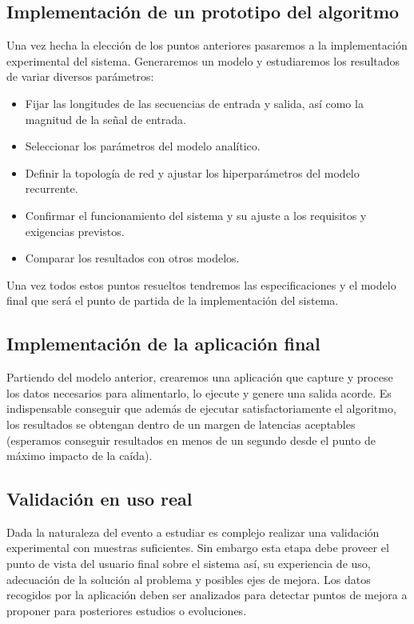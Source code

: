 \subsection{Implementación de un prototipo del algoritmo}
Una vez hecha la elección de los puntos anteriores pasaremos a la implementación experimental del sistema. Generaremos un modelo y estudiaremos los resultados de variar diversos parámetros:
\begin{itemize}
  \item Fijar las longitudes de las secuencias de entrada y salida, así como la magnitud de la señal de entrada.
  \item Seleccionar los parámetros del modelo analítico.
  \item Definir la topología de red y ajustar los hiperparámetros del modelo recurrente.
  \item Confirmar el funcionamiento del sistema y su ajuste a los requisitos y exigencias previstos.
  \item Comparar los resultados con otros modelos.
\end{itemize}
Una vez todos estos puntos resueltos tendremos las especificaciones y el modelo final que será el punto de partida de la implementación del sistema.

\subsection{Implementación de la aplicación final}
Partiendo del modelo anterior, crearemos una aplicación que capture y procese los datos necesarios para alimentarlo, lo ejecute y genere una salida acorde. Es indispensable conseguir que además de ejecutar satisfactoriamente el algoritmo, los resultados se obtengan dentro de un margen de latencias aceptables (esperamos conseguir resultados en menos de un segundo desde el punto de máximo impacto de la caída).

\subsection{Validación en uso real}
Dada la naturaleza del evento a estudiar es complejo realizar una validación experimental con muestras suficientes. Sin embargo esta etapa debe proveer el punto de vista del usuario final sobre el sistema así, su experiencia de uso, adecuación de la solución al problema y posibles ejes de mejora. Los datos recogidos por la aplicación deben ser analizados para detectar puntos de mejora a proponer para posteriores estudios o evoluciones.

